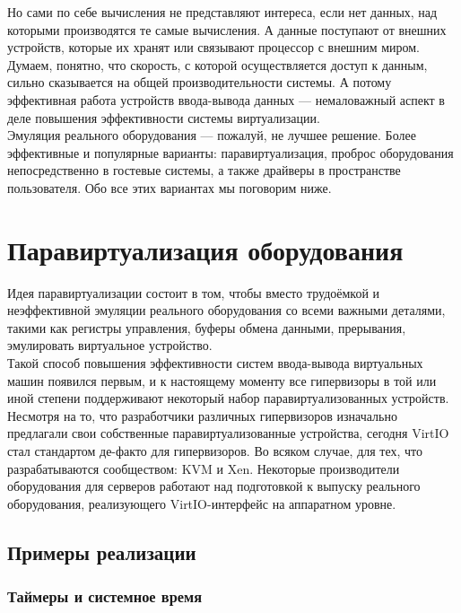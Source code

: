 \documentclass[14pt, a4paper]{article}
\begin{document}
Но сами по себе вычисления не представляют интереса, если нет данных, над которыми
производятся те самые вычисления. А данные поступают от внешних устройств, которые их хранят
или связывают процессор с внешним миром. Думаем, понятно, что скорость, с которой
осуществляется доступ к данным, сильно сказывается на общей производительности системы. А
потому эффективная работа устройств ввода-вывода данных — немаловажный аспект в деле
повышения эффективности системы виртуализации.\\

Эмуляция реального оборудования — пожалуй, не лучшее решение. Более эффективные и
популярные варианты: паравиртуализация, проброс оборудования непосредственно в гостевые
системы, а также драйверы в пространстве пользователя. Обо все этих вариантах мы поговорим
ниже.

\section*{Паравиртуализация оборудования}

Идея паравиртуализации состоит в том, чтобы вместо трудоёмкой и неэффективной эмуляции
реального оборудования со всеми важными деталями, такими как регистры управления, буферы
обмена данными, прерывания, эмулировать виртуальное устройство.\\

Такой способ повышения эффективности систем ввода-вывода виртуальных машин появился
первым, и к настоящему моменту все гипервизоры в той или иной степени поддерживают некоторый
набор паравиртуализованных устройств. Несмотря на то, что разработчики различных гипервизоров
изначально предлагали свои собственные паравиртуализованные устройства, сегодня VirtIO стал
стандартом де-факто для гипервизоров. Во всяком случае, для тех, что разрабатываются
сообществом: KVM и Xen. Некоторые производители оборудования для серверов работают над
подготовкой к выпуску реального оборудования, реализующего VirtIO-интерфейс на аппаратном
уровне.

\subsection*{Примеры реализации}

\subsubsection*{Таймеры и системное время}
\end{document}
